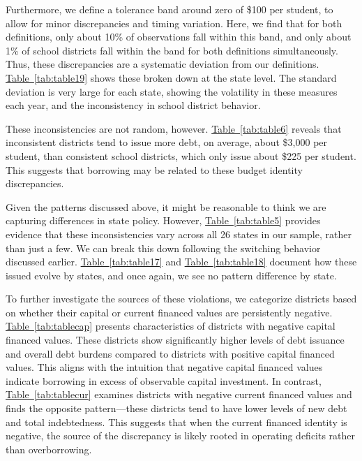 Furthermore, we define a tolerance band around zero of \$100 per student, to allow for minor discrepancies and timing variation. Here, we find that for both definitions, only about 10\% of observations fall within this band, and only about 1\% of school districts fall within the band for both definitions simultaneously. Thus, these discrepancies are a systematic deviation from our definitions. \hyperref[tab:table19]{Table~\ref*{tab:table19}} shows these broken down at the state level. The standard deviation is very large for each state, showing the volatility in these measures each year, and the inconsistency in school district behavior.

These inconsistencies are not random, however. \hyperref[tab:table6]{Table~\ref*{tab:table6}} reveals that inconsistent districts tend to issue more debt, on average, about \$3,000 per student, than consistent school districts, which only issue about \$225 per student. This suggests that borrowing may be related to these budget identity discrepancies.

Given the patterns discussed above, it might be reasonable to think we are capturing differences in state policy. However, \hyperref[tab:table5]{Table~\ref*{tab:table5}} provides evidence that these inconsistencies vary across all 26 states in our sample, rather than just a few. We can break this down following the switching behavior discussed earlier. \hyperref[tab:table17]{Table~\ref*{tab:table17}} and \hyperref[tab:table18]{Table~\ref*{tab:table18}} document how these issued evolve by states, and once again, we see no pattern difference by state.

To further investigate the sources of these violations, we categorize districts based on whether their capital or current financed values are persistently negative. \hyperref[tab:tablecap]{Table~\ref*{tab:tablecap}} presents characteristics of districts with negative capital financed values. These districts show significantly higher levels of debt issuance and overall debt burdens compared to districts with positive capital financed values. This aligns with the intuition that negative capital financed values indicate borrowing in excess of observable capital investment. In contrast, \hyperref[tab:tablecur]{Table~\ref*{tab:tablecur}} examines districts with negative current financed values and finds the opposite pattern—these districts tend to have lower levels of new debt and total indebtedness. This suggests that when the current financed identity is negative, the source of the discrepancy is likely rooted in operating deficits rather than overborrowing.

